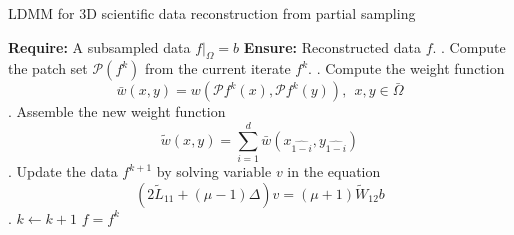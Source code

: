 \documentclass[a4paper]{article}
\begin{document}
\begin{algorithm}
\caption{LDMM for 3D scientific data reconstruction from partial sampling}
\begin{algorithmic}
\STATE \textbf{Require: } A subsampled data $f \vert_\Omega = b$
\STATE \textbf{Ensure: } Reconstructed data $f$.
. Compute the patch set $\mathcal{P}(f^k)$ from the current iterate $f^k$.
. Compute the weight function 
\begin{equation}
\bar{w}(x,y) = w(\mathcal{P}f^k(x), \mathcal{P}f^k(y)), ~ ~ x, y \in \bar{\Omega}
\end{equation}
. Assemble the new weight function
\begin{equation}
\tilde{w}(x,y) = \sum_{i=1}^d \bar{w}(x_{\widehat{1-i}},y_{\widehat{1-i}})
\end{equation}
. Update the data $f^{k+1}$ by solving variable $v$ in the equation
\begin{equation}
(2 \tilde{L}_{11} + (\mu - 1) \Delta) v = (\mu + 1) \tilde{W}_{12} b
\end{equation}
. $k \gets k + 1$
\ENDWHILE
\STATE $f = f^k$
\end{algorithmic}
\end{algorithm}
\end{document}
